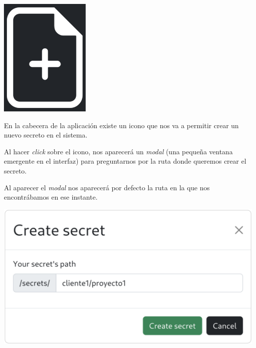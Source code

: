 \documentclass{\ClassPath/viu-tfm-template}
\begin{document}
{
\begin{minipage}{0.1\linewidth}
    \includegraphics[width=\linewidth]{img/new.png}
\end{minipage}
\hfill
\begin{minipage}{0.85\linewidth}
    En la cabecera de la aplicación existe un icono que nos va a permitir crear un nuevo secreto en el sistema.

    Al hacer \textit{click} sobre el icono, nos aparecerá un \textit{modal} (una pequeña ventana emergente en el interfaz) para preguntarnos por la ruta donde queremos crear el secreto.
\end{minipage}
}

Al aparecer el \textit{modal} nos aparecerá por defecto la ruta en la que nos encontrábamos en ese instante.

\begin{center}
    \includegraphics[width=0.7\linewidth]{img/new_secret.png}
\end{center}
\end{document}
